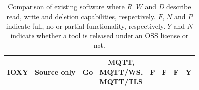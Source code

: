 \begin{table}[h]
\begin{tabular}{r|c|c|c|c|c|c|c}
        \midrule
        IOXY           & Source only       & Go     & \makecell{\ac{MQTT},\\ \ac{MQTT}/\ac{WS},\\ \ac{MQTT}/\ac{TLS}}       & \cellcolor{green!25}F  & \cellcolor{green!25}F  & \cellcolor{green!25}F & \cellcolor{green!25}Y \\ %
        \bottomrule
    \end{tabular}
    \caption[Comparison of existing software]{Comparison of existing software where $R$, $W$ and $D$ describe read, write and deletion capabilities, respectively. $F$, $N$ and $P$ indicate full, no or partial functionality, respectively. $Y$ and $N$ indicate whether a tool is released under an \ac{OSS} license or not.}
    \label{table:comparison-existing-software}
\end{table}